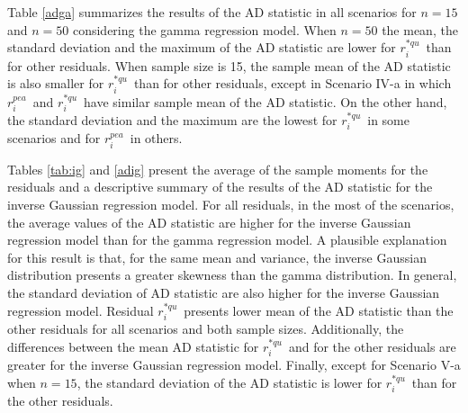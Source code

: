 \documentclass[11pt,authoryear,review,3p,times]{elsarticle}
\newcommand{\pea}{$r_i^{pea}$}
\newcommand{\aqu}{$r_i^{*qu}$}
\begin{document}
Table \ref{adga} summarizes the results of the AD statistic in all scenarios for $n=15$ and $n=50$ considering the gamma regression model.
When $n=50$ the mean, the standard deviation and the maximum of the AD statistic are lower for \aqu\, than for other residuals. 
When sample size is 15, the sample mean of the AD statistic is also smaller for  \aqu\, than for other residuals, except in Scenario IV-a in which \pea\, and \aqu\, have similar sample mean of the AD statistic. On the other hand, the standard deviation and the maximum are the lowest for \aqu\, in some scenarios and for \pea\, in others.

Tables \ref{tab:ig} and \ref{adig} present the average of the sample moments for the residuals and a descriptive summary of the results of the AD statistic for the inverse Gaussian regression model. 
For all residuals, in the most of the scenarios, the average values of the AD statistic are higher for the inverse Gaussian regression model than for the gamma regression model. A plausible explanation for this result is that, for the same mean and variance, the inverse Gaussian distribution presents a greater skewness than the gamma distribution. In general, the standard deviation of AD statistic are also higher for the inverse Gaussian regression model. Residual \aqu\, presents lower mean of the AD statistic than the other residuals for all scenarios and both sample sizes. Additionally, the differences between the mean AD statistic for \aqu\, and for the other residuals are greater for the inverse Gaussian regression model. Finally, except for Scenario V-a when $n=15$, the standard deviation of the AD statistic is lower for \aqu\, than for the other residuals. 
  

  
\end{document}
